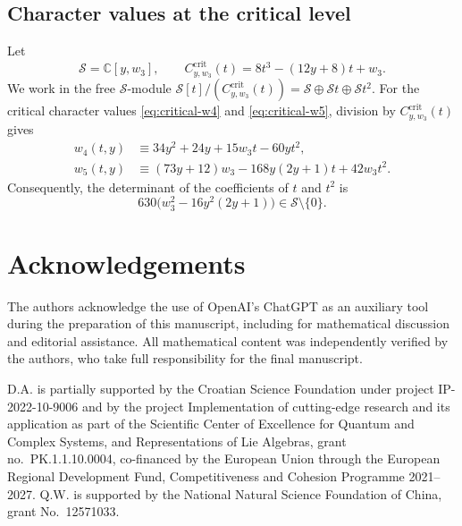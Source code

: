 \documentclass[11 pt]{amsart}
\theoremstyle{definition}
\theoremstyle{plain}
\begin{document}
\subsection*{Character values at the critical level}

Let
\[
\mathcal S=\mathbb C[y,w_3],
\qquad
C^{\mathrm{crit}}_{y,w_3}(t)
=8t^3-(12y+8)t+w_3.
\]
We work in the free $\mathcal S$-module
$\mathcal S[t]/(C^{\mathrm{crit}}_{y,w_3}(t))
=\mathcal S\oplus\mathcal S t\oplus\mathcal S t^2$.
For the critical character values
\eqref{eq:critical-w4} and \eqref{eq:critical-w5}, division by
$C^{\mathrm{crit}}_{y,w_3}(t)$ gives
\begin{align*}
w_4(t,y)
&\equiv34y^2+24y+15w_3t-60yt^2,\\
w_5(t,y)
&\equiv(73y+12)w_3-168y(2y+1)t+42w_3t^2.
\end{align*}
Consequently, the determinant of the coefficients of $t$ and $t^2$ is
\[
630\bigl(w_3^2-16y^2(2y+1)\bigr)
\in\mathcal S\setminus\{0\}.
\]

\section*{Acknowledgements}

The authors acknowledge the use of OpenAI's ChatGPT as an auxiliary
tool during the preparation of this manuscript, including for
mathematical discussion and editorial assistance. All mathematical
content was independently verified by the authors, who take full
responsibility for the final manuscript.

D.A. is partially supported by the Croatian Science Foundation under
project IP-2022-10-9006 and by the project Implementation of
cutting-edge research and its application as part of the Scientific Center
of Excellence for Quantum and Complex Systems, and Representations of Lie
Algebras, grant no.~PK.1.1.10.0004, co-financed by the European Union
through the European Regional Development Fund, Competitiveness and
Cohesion Programme 2021--2027.
Q.W. is supported by the National Natural Science Foundation of China,
grant No.~12571033.

\endgroup
\end{document}
